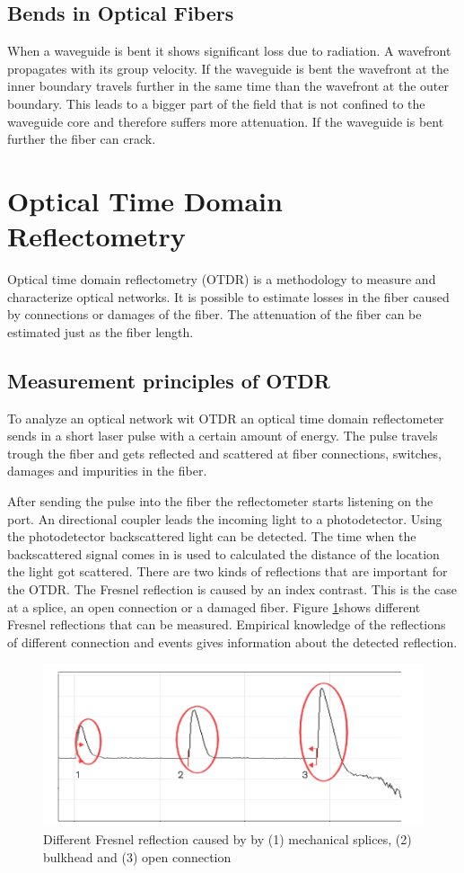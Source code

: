 \subsection{Bends in Optical Fibers}

When a waveguide is bent it shows significant loss due to radiation. A wavefront propagates with its group velocity. If the waveguide is bent the wavefront at the inner boundary travels further in the same time than the wavefront at the outer boundary. This leads to a bigger part of the field that is not confined to the waveguide core and therefore suffers more attenuation. If the waveguide is bent further the fiber can crack.


\section{Optical Time Domain Reflectometry}
Optical time domain reflectometry (OTDR) is a methodology to measure and characterize optical networks. It is possible to estimate losses in the fiber caused by connections or damages of the fiber. The attenuation of the fiber can be estimated just as the fiber length.

\subsection{Measurement principles of OTDR}
To analyze an optical network wit OTDR an optical time domain reflectometer sends in a short laser pulse with a certain amount of energy. The pulse travels trough the fiber and gets reflected and scattered at fiber connections, switches, damages and impurities in the fiber. 

After sending the pulse into the fiber the reflectometer starts listening on the port. An directional coupler leads the incoming light to a photodetector. Using the photodetector backscattered light can be detected. The time when the backscattered signal comes in is used to calculated the distance of the location the light got scattered.
There are two kinds of reflections that are important for the OTDR.
The Fresnel reflection is caused by an index contrast. This is the case at a splice, an open connection or a damaged fiber. Figure \ref{fig:fresnel}\footnotemark[1] shows different Fresnel reflections that can be measured. Empirical knowledge of the reflections of different connection and events gives information about the detected reflection.
 

\begin{figure}%
\centering
\includegraphics[width=.6\columnwidth]{grafiken/fresnel.png}%
\caption{Different Fresnel reflection caused by by (1) mechanical splices, (2) bulkhead and (3) open connection}%
\label{fig:fresnel}%
\end{figure}

